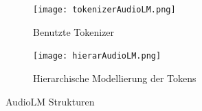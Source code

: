 \documentclass[
  a4paper,  %
  twoside,  %
  bibliography=totoc,
  headsepline,
  cleardoublepage=empty,
  parskip=half,
  draft=false
]{scrbook}
\begin{document}
\begin{figure}[h]
\centering
\begin{subfigure}{1.0\textwidth}
  \centering
  \texttt{[image: tokenizerAudioLM.png]}
  \caption[AudioLM Tokenisierungsverfahren]{Benutzte Tokenizer}
  \label{fig:tokenizerAudioLM}
\end{subfigure}

\vspace{1em} %

\begin{subfigure}{1.0\textwidth}
  \centering
  \texttt{[image: hierarAudioLM.png]}
  \caption[AudioLM Hierarchische Modellierung der Tokens]{Hierarchische Modellierung der Tokens}
  \label{fig:hierarAudioLM}
\end{subfigure}
\caption{AudioLM Strukturen \cite{borsos_audiolm_2022}}
\label{fig:test}
\end{figure}
\end{document}
